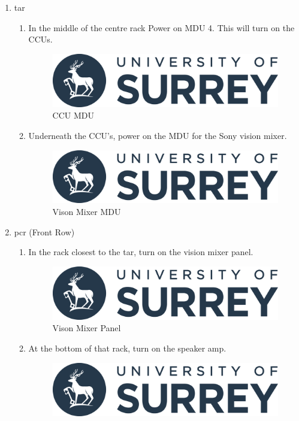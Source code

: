 \documentclass{report}
\begin{document}
\begin{enumerate}
    \item \gls{tar}
          \begin{enumerate}
              \item In the middle of the centre rack Power on MDU 4. This will turn on the CCUs.
              \begin{figure}[h]
                \centering
                \includegraphics[width=.5\linewidth]{uos-logo.png}
                \caption{CCU MDU}
              \end{figure}
              \item Underneath the CCU's, power on the MDU for the Sony vision mixer.
              \begin{figure}[h]
                \centering
                \includegraphics[width=.5\linewidth]{uos-logo.png}
                \caption{Vison Mixer MDU}
              \end{figure}
          \end{enumerate}
    \item \gls{pcr} (Front Row)
    \hypertarget{pos1}{}%
          \begin{enumerate}
              \item In the rack closest to the \gls{tar}, turn on the vision mixer panel.
              \begin{figure}[h]
                \centering
                \includegraphics[width=.5\linewidth]{uos-logo.png}
                \caption{Vison Mixer Panel}
              \end{figure}
              \item At the bottom of that rack, turn on the speaker amp.
              \begin{figure}[h]
                \centering
                \includegraphics[width=.5\linewidth]{uos-logo.png}

\end{figure}
\end{enumerate}
\end{enumerate}
\end{document}
